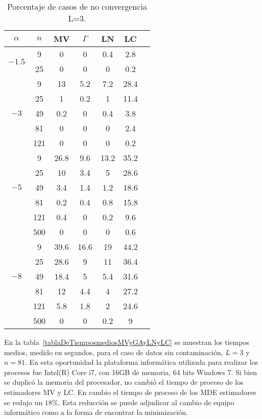 \begin{table}[hbt]
	\caption{Porcentaje de casos de no convergencia  L=$3$.}
	\centering
	\label{NoConvMLyNGyLNyLC_L=3}
	\begin{tabular}{c*6{S}}
			\toprule		
			$\alpha$ & $n$ & MV & $\Gamma$ & LN &  LC\\
			\midrule
			&   9 &  0  &  0  &  0.4  &   2.8 \\
			&   25  &  0  &  0  &  0  &  0.2 \\
			\midrule
			&    9  &  13     &  5.2   &  7.2   &   28.4 \\ 
			&   25  &  1      &  0.2   &  1     &   11.4 \\
			&   49  &  0.2    &  0     &  0.4   &  3.8 \\ 
			&   81  &  0      &  0     &  0     &  2.4 \\ 
			&  121  &  0      &  0     &  0     &  0.2 \\ 
			\midrule
			&    9  &  26.8   &  9.6   &  13.2  &   35.2 \\ 
			&   25  &  10     &  3.4   &  5     &  28.6 \\ 
			&   49  &  3.4    &  1.4   &  1.2   &  18.6 \\ 
			&   81  &  0.2    &  0.4   &  0.8   &  15.8 \\ 
			&  121  &  0.4    &  0     &  0.2   &  9.6 \\ 
			&  500  &  0      &  0     &  0     &  0.6 \\ 
			\midrule
			&    9   &  39.6  &  16.6  &  19    &  44.2 \\ 
			&   25   &  28.6  &  9     &  11    &  36.4 \\ 
			&   49   &  18.4  &  5     &  5.4   &  31.6 \\ 
			&   81   &  12    &  4.4   &  4     &  27.2 \\ 
			&  121   &  5.8   &  1.8   &  2     &  24.6 \\ 
			&  500   &  0     &  0     &  0.2   &  9 \\
			\bottomrule 	
		\end{tabular}
\end{table}	

En la tabla~\ref{tablaDeTiemposmediosMVyGAyLNyLC} se muestran los tiempos medios, medido en segundos, para el caso de datos sin contaminación, $L=3$ y $n=81$. En esta oportunidad la plataforma informática utilizada para realizar los procesos fue Intel(R) Core i7, con 16GB de memoria, 64 bits Windows 7. Si bien se duplicó la memoria del procesador, no cambió el tiempo de proceso de los estimadores MV y LC. En cambio el tiempo de proceso de los MDE estimadores se redujo un $18\%$. Esta reducción se puede adjudicar al cambio de equipo informático como a la forma de encontrar la minimización.

